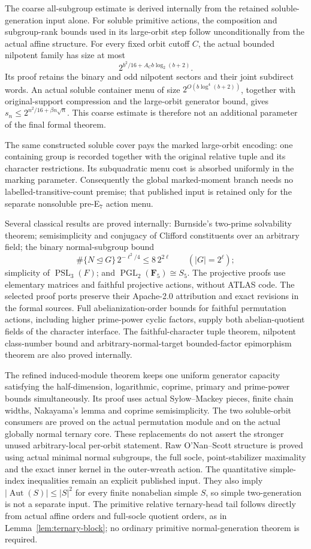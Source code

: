 The coarse all-subgroup estimate is derived internally from the retained
soluble-generation input alone. For soluble primitive actions, the
composition and subgroup-rank bounds used in its large-orbit step follow
unconditionally from the actual affine structure. For every fixed orbit cutoff $C$, the actual
bounded nilpotent family has size at most
\[
  2^{b^2/16+A_C b\log_2(b+2)}.
\]
Its proof retains the binary and odd nilpotent sectors and their joint
subdirect words. An actual soluble container menu of size
$2^{O(b\log^4(b+2))}$, together with original-support compression and the
large-orbit generator bound, gives
$s_n\leq 2^{n^2/16+\beta n\sqrt n}$. This coarse estimate is therefore
not an additional parameter of the final formal theorem.

The same constructed soluble cover pays the marked large-orbit encoding:
one containing group is recorded together with the original relative
tuple and its character restrictions. Its subquadratic menu cost is
absorbed uniformly in the marking parameter. Consequently the global
marked-moment branch needs no labelled-transitive-count premise; that
published input is retained only for the separate nonsoluble pre-E$_7$
action menu.

Several classical results are proved internally: Burnside's two-prime
solvability theorem; semisimplicity and conjugacy of Clifford constituents
over an arbitrary field; the binary normal-subgroup bound
\[
 \#\{N\mathrel{\unlhd}G\}\,2^{-\ell^2/4}\leq 8\,2^{2\ell}
 \qquad (|G|=2^\ell);
\]
simplicity of $\operatorname{PSL}_3(F)$; and
$\operatorname{PGL}_2(\mathbf F_5)\cong S_5$.
The projective proofs use elementary matrices and faithful projective
actions, without ATLAS code. The selected proof ports preserve their
Apache-2.0 attribution and exact revisions in the formal sources.
Full abelianization-order bounds for faithful permutation actions,
including higher prime-power cyclic factors, supply both abelian-quotient
fields of the character interface. The faithful-character tuple theorem,
nilpotent class-number bound and arbitrary-normal-target bounded-factor
epimorphism theorem are also proved internally.

The refined induced-module theorem keeps one uniform generator capacity
satisfying the half-dimension, logarithmic, coprime, primary and prime-power
bounds simultaneously. Its proof uses actual Sylow--Mackey pieces,
finite chain widths, Nakayama's lemma and coprime semisimplicity. The two
soluble-orbit consumers are proved on the actual permutation module and
on the actual globally normal ternary core. These replacements do not
assert the stronger unused arbitrary-local per-orbit statement.
Raw O'Nan--Scott structure is proved using actual minimal normal subgroups,
the full socle, point-stabilizer maximality and the exact inner kernel in
the outer-wreath action. The quantitative simple-index inequalities remain
an explicit published input. They also imply $|\operatorname{Aut}(S)|\leq|S|^2$
for every finite nonabelian simple $S$, so simple two-generation is not a
separate input. The primitive relative ternary-head tail follows directly
from actual affine orders and full-socle quotient orders, as in
Lemma~\ref{lem:ternary-block}; no ordinary primitive normal-generation
theorem is required.

